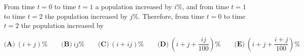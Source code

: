 From time $t=0$ to time $t=1$ a population increased by $i\%$, and from time $t=1$ to time $t=2$ the population increased by $j\%$. Therefore, from time $t=0$ to time $t=2$ the population increased by

$\textbf{(A)}\ (i+j)\%\qquad\textbf{(B)}\ ij\%\qquad\textbf{(C)}\ (i+ij)\%\qquad\textbf{(D)}\ \left(i+j+\dfrac{ij}{100}\right)\%\qquad\textbf{(E)}\ \left(i+j+\dfrac{i+j}{100}\right)\%$
